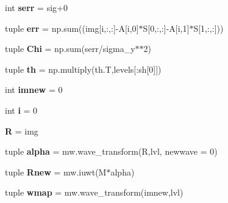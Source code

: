 \begin{DoxyCompactItemize}
\item 
\hypertarget{namespace_mu_s_c_a_de_t_1_1_m_c_a_a8e682afd2789c3bbaa4402ad238f6629}{}int {\bfseries serr} = sig+0\label{namespace_mu_s_c_a_de_t_1_1_m_c_a_a8e682afd2789c3bbaa4402ad238f6629}

\item 
\hypertarget{namespace_mu_s_c_a_de_t_1_1_m_c_a_a7e9085f77d4d2307774e225f400c4f6b}{}tuple {\bfseries err} = np.\+sum((img\mbox{[}i,\+:,\+:\mbox{]}-\/A\mbox{[}i,0\mbox{]}$\ast$S\mbox{[}0,\+:,\+:\mbox{]}-\/A\mbox{[}i,1\mbox{]}$\ast$S\mbox{[}1,\+:,\+:\mbox{]}))\label{namespace_mu_s_c_a_de_t_1_1_m_c_a_a7e9085f77d4d2307774e225f400c4f6b}

\item 
\hypertarget{namespace_mu_s_c_a_de_t_1_1_m_c_a_a59c69649b787d3f04c0bf40f2b3c0e4c}{}tuple {\bfseries Chi} = np.\+sum(serr/sigma\+\_\+y$\ast$$\ast$2)\label{namespace_mu_s_c_a_de_t_1_1_m_c_a_a59c69649b787d3f04c0bf40f2b3c0e4c}

\item 
\hypertarget{namespace_mu_s_c_a_de_t_1_1_m_c_a_ad5050b8d90e9d7eac94bb9fc23915a5c}{}tuple {\bfseries th} = np.\+multiply(th.\+T,levels\mbox{[}\+:sh\mbox{[}0\mbox{]}\mbox{]})\label{namespace_mu_s_c_a_de_t_1_1_m_c_a_ad5050b8d90e9d7eac94bb9fc23915a5c}

\item 
\hypertarget{namespace_mu_s_c_a_de_t_1_1_m_c_a_ab396e5045427a904638c2b9224c82534}{}int {\bfseries imnew} = 0\label{namespace_mu_s_c_a_de_t_1_1_m_c_a_ab396e5045427a904638c2b9224c82534}

\item 
\hypertarget{namespace_mu_s_c_a_de_t_1_1_m_c_a_a2282ba76b3c81adfebbca5de9361e017}{}int {\bfseries i} = 0\label{namespace_mu_s_c_a_de_t_1_1_m_c_a_a2282ba76b3c81adfebbca5de9361e017}

\item 
\hypertarget{namespace_mu_s_c_a_de_t_1_1_m_c_a_a9e58833ddffa1209f640c8d968ce7232}{}{\bfseries R} = img\label{namespace_mu_s_c_a_de_t_1_1_m_c_a_a9e58833ddffa1209f640c8d968ce7232}

\item 
\hypertarget{namespace_mu_s_c_a_de_t_1_1_m_c_a_a1f9b2383b6fc6a596f79e0fad095d235}{}tuple {\bfseries alpha} = mw.\+wave\+\_\+transform(R,lvl, newwave = 0)\label{namespace_mu_s_c_a_de_t_1_1_m_c_a_a1f9b2383b6fc6a596f79e0fad095d235}

\item 
\hypertarget{namespace_mu_s_c_a_de_t_1_1_m_c_a_afb9d40f43b5dfe2b3ed9a007f6ecb5e8}{}tuple {\bfseries Rnew} = mw.\+iuwt(M$\ast$alpha)\label{namespace_mu_s_c_a_de_t_1_1_m_c_a_afb9d40f43b5dfe2b3ed9a007f6ecb5e8}

\item 
\hypertarget{namespace_mu_s_c_a_de_t_1_1_m_c_a_a828c2f386ff9bbc6ce287217e6bc7da1}{}tuple {\bfseries wmap} = mw.\+wave\+\_\+transform(imnew,lvl)\label{namespace_mu_s_c_a_de_t_1_1_m_c_a_a828c2f386ff9bbc6ce287217e6bc7da1}

\end{DoxyCompactItemize}



